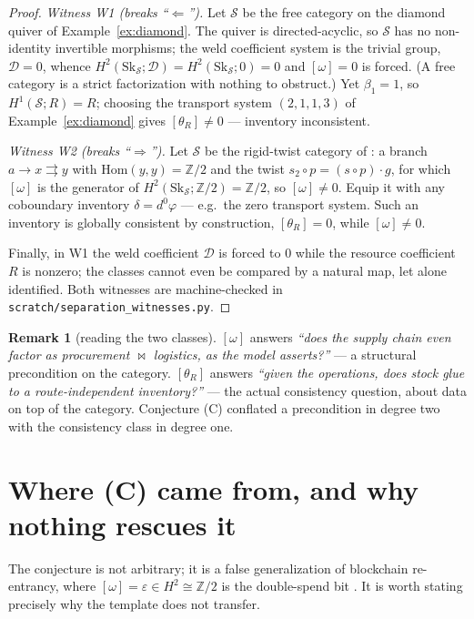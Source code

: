 \documentclass[11pt]{article}
\theoremstyle{definition}
\newtheorem{remark}[theorem]{Remark}
\newcommand{\Sc}{\mathcal{S}}
\newcommand{\D}{\mathcal{D}}
\newcommand{\Sk}{\mathrm{Sk}}
\newcommand{\Hom}{\mathrm{Hom}}
\newcommand{\Z}{\mathbb{Z}}
\newcommand{\bowtiemap}{\bowtie}
\begin{document}
\begin{proof}
\emph{Witness W1 (breaks ``$\Leftarrow$'').} Let $\Sc$ be the free category on the diamond
quiver of Example~\ref{ex:diamond}. The quiver is directed-acyclic, so $\Sc$ has no
non-identity invertible morphisms; the weld coefficient system is the trivial group, $\D=0$,
whence $H^2(\Sk_\Sc;\D)=H^2(\Sk_\Sc;0)=0$ and $[\omega]=0$ is forced. (A free category is a
strict factorization with nothing to obstruct.) Yet $\beta_1=1$, so $H^1(\Sc;R)=R$; choosing the
transport system $(2,1,1,3)$ of Example~\ref{ex:diamond} gives $[\theta_R]\neq0$ --- inventory
inconsistent.

\emph{Witness W2 (breaks ``$\Rightarrow$'').} Let $\Sc$ be the rigid-twist category of
\cite{gobstr}: a branch $a\to x\rightrightarrows y$ with $\Hom(y,y)=\Z/2$ and the twist
$s_2\circ p=(s\circ p)\cdot g$, for which $[\omega]$ is the generator of $H^2(\Sk_\Sc;\Z/2)=\Z/2$,
so $[\omega]\neq0$. Equip it with any coboundary inventory $\delta=d^0\varphi$ --- e.g.\ the zero
transport system. Such an inventory is globally consistent by construction, $[\theta_R]=0$,
while $[\omega]\neq0$.

Finally, in W1 the weld coefficient $\D$ is forced to $0$ while the resource coefficient $R$ is
nonzero; the classes cannot even be compared by a natural map, let alone identified. Both
witnesses are machine-checked in \texttt{scratch/separation\_witnesses.py}.
\end{proof}

\begin{remark}[reading the two classes]
$[\omega]$ answers \emph{``does the supply chain even factor as procurement $\bowtiemap$
logistics, as the model asserts?''} --- a structural precondition on the category. $[\theta_R]$
answers \emph{``given the operations, does stock glue to a route-independent inventory?''} ---
the actual consistency question, about data on top of the category. Conjecture (C) conflated a
precondition in degree two with the consistency class in degree one.
\end{remark}

\section{Where (C) came from, and why nothing rescues it}\label{sec:reconcile}

The conjecture is not arbitrary; it is a false generalization of blockchain re-entrancy, where
$[\omega]=\varepsilon\in H^2\cong\Z/2$ is the double-spend bit \cite{orch}. It is worth stating
precisely why the template does not transfer.
\end{document}
